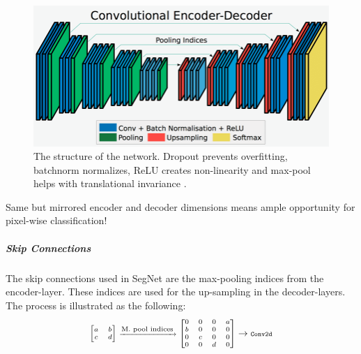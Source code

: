 \documentclass[
    ,title     = {{Image Segmentation for Smart Agriculture}}
    ,subject   = {{This is the subject of my work}}
    ,papersize = {{a1paper}}
    ,nocrop
]{dtuposter}
\begin{document}
\begin{dtupostercontent}
\begin{figure}
	\centering
	\includegraphics[width=0.9\linewidth]{Encoder-Decoder2}
	\caption{The structure of the network. Dropout prevents overfitting, batchnorm normalizes, ReLU creates non-linearity and max-pool helps with translational invariance \cite{Seg}.}
	\label{fig:Structure}
\end{figure}

Same but mirrored encoder and decoder dimensions means ample opportunity for pixel-wise classification!

 
\subparagraph{Skip Connections}
The skip connections used in SegNet are the max-pooling indices from the encoder-layer. These indices are used for the up-sampling in the decoder-layers. The process is illustrated as the following:
\begin{equation*}\label{key}
\scriptsize
\begin{bmatrix}a&b\\c&d\end{bmatrix} \xrightarrow{\text{\scriptsize M. pool indices}}
\begin{bmatrix}0&0&0&a\\b&0&0&0\\0&c&0&0\\0&0&d&0\end{bmatrix} 
\rightarrow 
\texttt{\scriptsize Conv2d}
\end{equation*}


\end{dtupostercontent}
\end{document}
